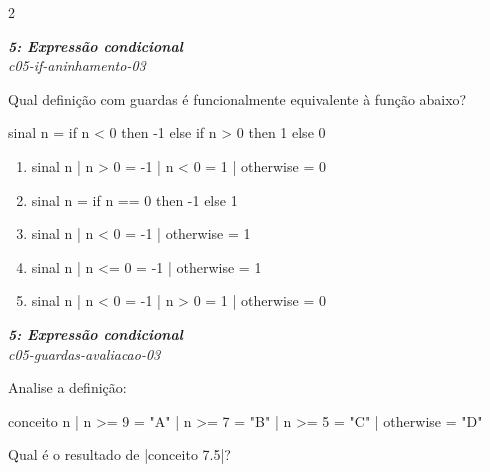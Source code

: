\documentclass[a4paper,10pt,brazil]{article}
\begin{document}
\begin{multicols}{2}
\begin{enumerate}
\end{enumerate}

\begin{flushright}
  \footnotesize
  \textit{\textbf{5: Expressão condicional}}\\
  \textit{c05-if-aninhamento-03}\\

\end{flushright}
Qual definição com guardas é funcionalmente equivalente à função abaixo?
\begin{haskellcode}
sinal n = if n < 0 then -1 else if n > 0 then 1 else 0
\end{haskellcode}

\begin{enumerate}
  \item \begin{haskellcode}
sinal n
  | n > 0     = -1
  | n < 0     = 1
  | otherwise = 0
\end{haskellcode}

  \item \begin{haskellcode}
sinal n = if n == 0 then -1 else 1
\end{haskellcode}

  \item \begin{haskellcode}
sinal n
  | n < 0     = -1
  | otherwise = 1
\end{haskellcode}

  \item \begin{haskellcode}
sinal n
  | n <= 0    = -1
  | otherwise = 1
\end{haskellcode}

  \item \begin{haskellcode}
sinal n
  | n < 0     = -1
  | n > 0     = 1
  | otherwise = 0
\end{haskellcode}


\end{enumerate}

\begin{flushright}
  \footnotesize
  \textit{\textbf{5: Expressão condicional}}\\
  \textit{c05-guardas-avaliacao-03}\\

\end{flushright}
Analise a definição:
\begin{haskellcode}
conceito n
  | n >= 9    = "A"
  | n >= 7    = "B"
  | n >= 5    = "C"
  | otherwise = "D"
\end{haskellcode}
Qual é o resultado de \haskellinline|conceito 7.5|?


\end{multicols}
\end{document}
